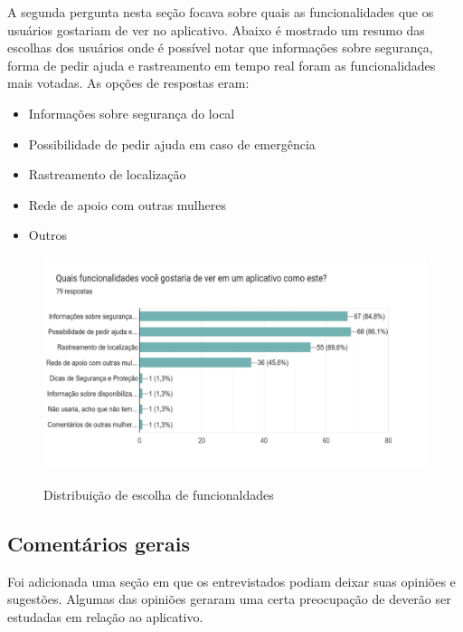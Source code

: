 A segunda pergunta nesta seção focava sobre quais as funcionalidades que os usuários gostariam de ver no aplicativo. Abaixo é mostrado um resumo das escolhas dos usuários onde é possível notar que informações sobre segurança, forma de pedir ajuda e rastreamento em tempo real foram as funcionalidades mais votadas. As opções de respostas eram:
\begin{itemize}
  \item Informações sobre segurança do local
  \item Possibilidade de pedir ajuda em caso de emergência
  \item Rastreamento de localização
  \item Rede de apoio com outras mulheres
  \item Outros
\end{itemize}

\begin{figure}[h]
  \begin{center}
  \includegraphics[width=1.0\linewidth]{images/distribuicao-escolha-funcionalidades.png}\\
  \end{center}
  \caption[Distribuição de escolha de funcionalidades]{Distribuição de escolha de funcionaldades}
  \label{fig:distribuicao-escolha-funcionalidades}
\end{figure}

\subsection{Comentários gerais}
Foi adicionada uma seção em que os entrevistados podiam deixar suas opiniões e sugestões. Algumas das opiniões geraram uma certa preocupação de deverão ser estudadas em relação ao aplicativo. 


